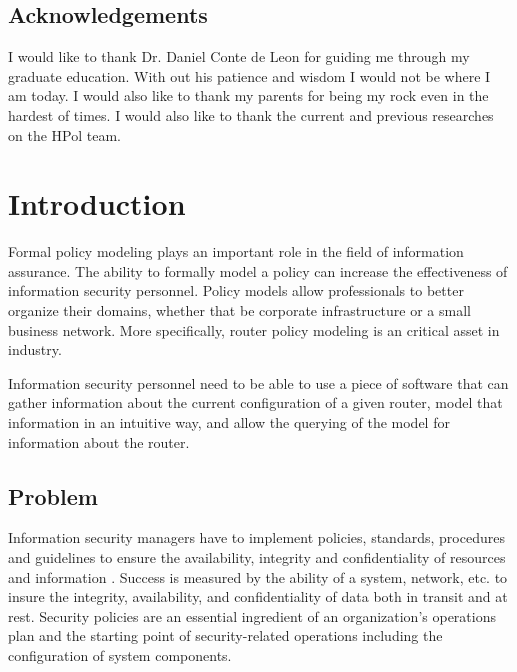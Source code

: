 \documentclass[12pt,letterpaper]{report}
\renewcommand{\thepage}{\roman{page}}
\begin{document}
\section*{\large{Acknowledgements}}
I would like to thank Dr. Daniel Conte de Leon for guiding me through my graduate education. With out his patience and wisdom I would not be where I am today. I would also like to thank my parents for being my rock even in the hardest of times. I would also like to thank the current and previous researches on the HPol team.
\pagebreak

\tableofcontents
\pagebreak


\listoffigures
\pagebreak

\lstlistoflistings
\pagebreak

\setcounter{page}{1}
\renewcommand{\thepage}{\arabic{page}}
\chapter{Introduction}
\label{Chapter:Introduction}
\acresetall

Formal policy modeling plays an important role in the field of information assurance. The ability to formally model a policy can increase the effectiveness of information security personnel. Policy models allow professionals to better organize their domains, whether that be corporate infrastructure or a small business network. More specifically, router policy modeling is an critical asset in industry.

Information security personnel need to be able to use a piece of software that can gather information about the current configuration of a given router, model that information in an intuitive way, and allow the querying of the model for information about the router. 

\section{Problem}

Information security managers have to implement policies, standards, procedures and guidelines to ensure the availability, integrity and confidentiality of resources and information \cite{HanscheSBertiJHareC2004}. Success is measured by the ability of a system, network, etc. to insure the integrity, availability, and confidentiality of data both in transit and at rest. Security policies are an essential ingredient of an organization's operations plan and the starting point of security-related operations including the configuration of system components.
\end{document}
